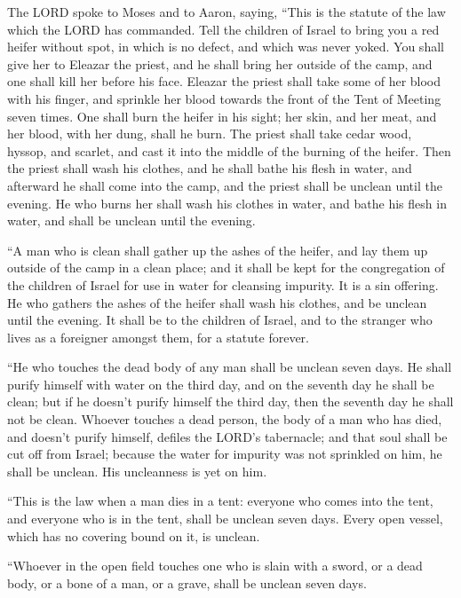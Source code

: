  The LORD spoke to Moses and to Aaron, saying, 
``This is the statute of the law which the LORD has commanded. Tell the
children of Israel to bring you a red heifer without spot, in which is
no defect, and which was never yoked.  You shall give her to
Eleazar the priest, and he shall bring her outside of the camp, and one
shall kill her before his face.  Eleazar the priest shall
take some of her blood with his finger, and sprinkle her blood towards
the front of the Tent of Meeting seven times.  One shall
burn the heifer in his sight; her skin, and her meat, and her blood,
with her dung, shall he burn.  The priest shall take cedar
wood, hyssop, and scarlet, and cast it into the middle of the burning of
the heifer.  Then the priest shall wash his clothes, and he
shall bathe his flesh in water, and afterward he shall come into the
camp, and the priest shall be unclean until the evening.  He
who burns her shall wash his clothes in water, and bathe his flesh in
water, and shall be unclean until the evening.

 ``A man who is clean shall gather up the ashes of the
heifer, and lay them up outside of the camp in a clean place; and it
shall be kept for the congregation of the children of Israel for use in
water for cleansing impurity. It is a sin offering.  He who
gathers the ashes of the heifer shall wash his clothes, and be unclean
until the evening. It shall be to the children of Israel, and to the
stranger who lives as a foreigner amongst them, for a statute forever.

 ``He who touches the dead body of any man shall be unclean
seven days.  He shall purify himself with water on the
third day, and on the seventh day he shall be clean; but if he doesn't
purify himself the third day, then the seventh day he shall not be
clean.  Whoever touches a dead person, the body of a man
who has died, and doesn't purify himself, defiles the LORD's tabernacle;
and that soul shall be cut off from Israel; because the water for
impurity was not sprinkled on him, he shall be unclean. His uncleanness
is yet on him.

 ``This is the law when a man dies in a tent: everyone who
comes into the tent, and everyone who is in the tent, shall be unclean
seven days.  Every open vessel, which has no covering bound
on it, is unclean.

 ``Whoever in the open field touches one who is slain with
a sword, or a dead body, or a bone of a man, or a grave, shall be
unclean seven days.

